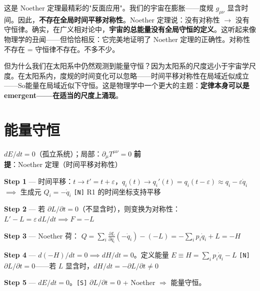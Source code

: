 这是 Noether 定理最精彩的"反面应用"。我们的宇宙在膨胀——度规 $g_{\mu\nu}$ 显含时间。因此，\textbf{不存在全局时间平移对称性}。Noether 定理说：没有对称性 $\to$ 没有守恒律。确实，在广义相对论中，\textbf{宇宙的总能量没有全局守恒的定义}。这听起来像物理学的丑闻——但恰恰相反：它完美地证明了 Noether 定理的正确性。对称性不存在 = 守恒律不存在。不多不少。

但为什么我们在太阳系中仍然观测到能量守恒？因为太阳系的尺度远小于宇宙学尺度。在太阳系内，度规的时间变化可以忽略——时间平移对称性在局域近似成立——So能量在局域近似下守恒。这是物理学中一个更大的主题：\textbf{定律本身可以是 emergent——在适当的尺度上涌现}。

\section{能量守恒}

\begin{lawbox}[能量守恒]
  $dE/dt = 0$（孤立系统）；局部：$\partial_\mu T^{\mu\nu} = 0$
  \quad\textbf{前提}：Noether 定理（时间平移对称性）
\end{lawbox}

\begin{derivationbox}[推导：时间平移对称性到能量守恒]
  \textbf{Step 1} — 时间平移：$t \to t' = t + \varepsilon$，$q_i(t) \to q_i'(t) = q_i(t-\varepsilon) \approx q_i - \varepsilon\dot{q}_i$
  $\implies$ 生成元 $Q_i = -\dot{q}_i$
  \hfill\texttt{[N]} R1 的时间坐标支持平移

  \textbf{Step 2} — 若 $\partial L/\partial t = 0$（不显含时），则变换为对称性：
  $L' - L = \varepsilon\,dL/dt \implies F = -L$

  \textbf{Step 3} — Noether 荷：
  $Q = \sum_i\frac{\partial L}{\partial\dot{q}_i}(-\dot{q}_i) - (-L) = -\sum_i p_i\dot{q}_i + L = -H$

  \textbf{Step 4} — $d(-H)/dt = 0 \implies dH/dt = 0$。定义能量 $E \equiv H = \sum_i p_i\dot{q}_i - L$
  \hfill\texttt{[N]} $\partial L/\partial t = 0$——若 $L$ 显含时，$dH/dt = -\partial L/\partial t \neq 0$

  \textbf{Step 5} — $dE/dt = 0$。\quad\texttt{[S]} $\partial L/\partial t = 0$ + Noether $\Rightarrow$ 能量守恒。
\end{derivationbox}


